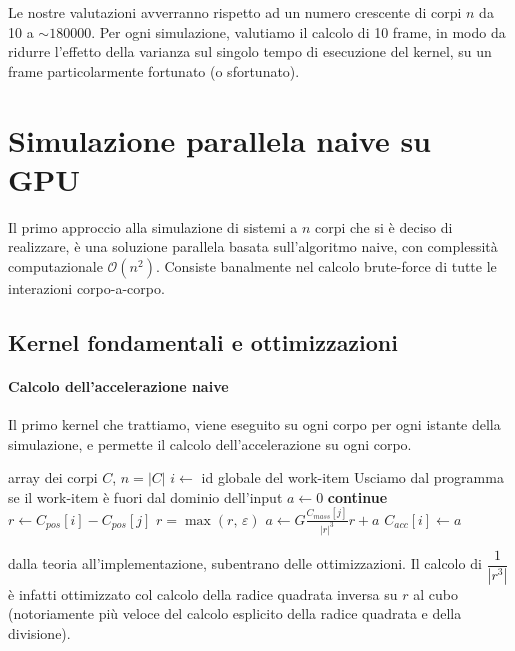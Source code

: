 \documentclass{article}
\newcommand{\Continue}{\State \textbf{continue}}
\begin{document}
	Le nostre valutazioni avverranno rispetto ad un numero crescente di corpi $n$ da 10 a $\sim 180 000$. Per ogni simulazione, valutiamo il calcolo di 10 frame, in modo da ridurre l'effetto della varianza sul singolo tempo di esecuzione del kernel, su un frame particolarmente fortunato (o sfortunato).
	\newpage
	
	\section{Simulazione parallela naive su GPU}
	Il primo approccio alla simulazione di sistemi a $n$ corpi che si è deciso di realizzare, è una soluzione parallela basata sull'algoritmo naive, con complessità computazionale $\mathcal{O}(n^2)$. Consiste banalmente nel calcolo brute-force di tutte le interazioni corpo-a-corpo.
	
	
	\subsection{Kernel fondamentali e ottimizzazioni}
	
	\paragraph{Calcolo dell'accelerazione naive}
	Il primo kernel che trattiamo, viene eseguito su ogni corpo per ogni istante della simulazione, e permette il calcolo dell'accelerazione su ogni corpo.
	\begin{algorithm}
		\caption{Kernel per il calcolo dell'accelerazione di un corpo}
		\begin{algorithmic}[1]
			\Require array dei corpi $C$, $n = |C|$
			\State $i \gets$ id globale del work-item
			\Return
			\Comment Usciamo dal programma se il work-item è fuori dal dominio dell'input
			\EndIf
			\State $a \gets 0$
			 \Continue 
			\EndIf
			\State $ r \gets C_{pos}[i] - C_{pos}[j]$
			\State $r = \max(r,\, \varepsilon)$
			\State $a \gets G \frac{C_{mass}[j]}{|r|^3} r + a $
			\EndFor
			\State $C_{acc}[i] \gets a$
		\end{algorithmic}
	\end{algorithm}
	dalla teoria all'implementazione, subentrano delle ottimizzazioni. Il calcolo di $\dfrac{1}{|r^3|}$ è infatti ottimizzato col calcolo della radice quadrata inversa su $r$ al cubo (notoriamente più veloce del calcolo esplicito della radice quadrata e della divisione).
	
\end{document}
